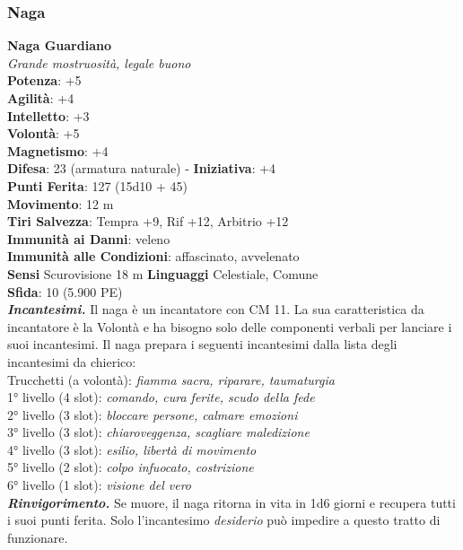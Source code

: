 \begin{multicols}{2}
\subsubsection{Naga}

\medskip\textbf{Naga Guardiano}\\
\emph{Grande mostruosità, legale buono}\\
\textbf{Potenza}: +5\\
\textbf{Agilità}: +4\\
\textbf{Intelletto}: +3\\
\textbf{Volontà}: +5\\
\textbf{Magnetismo}: +4\\
\textbf{Difesa}: 23 (armatura naturale) - \textbf{Iniziativa}: +4\\
\textbf{Punti Ferita}: 127 (15d10 + 45)\\
\textbf{Movimento}: 12 m\\
\textbf{Tiri Salvezza}: Tempra +9, Rif +12, Arbitrio +12\\
\textbf{Immunità ai Danni}: veleno\\
\textbf{Immunità alle Condizioni}: affascinato, avvelenato\\
\textbf{Sensi} Scurovisione 18 m \textbf{Linguaggi} Celestiale, Comune\\
\textbf{Sfida}: 10 (5.900 PE)\smallskip\\
\emph{\textbf{Incantesimi.}} Il naga è un incantatore con CM 11. La sua caratteristica da incantatore è la Volontà e ha bisogno solo delle componenti verbali per lanciare i suoi incantesimi. Il naga prepara i seguenti incantesimi dalla lista degli incantesimi da chierico:\\
Trucchetti (a volontà): \emph{fiamma sacra, riparare, taumaturgia}\\
1° livello (4 slot): \emph{comando, cura ferite, scudo della fede}\\
2° livello (3 slot): \emph{bloccare persone, calmare emozioni}\\
3° livello (3 slot): \emph{chiaroveggenza, scagliare maledizione}\\
4° livello (3 slot): \emph{esilio, libertà di movimento}\\
5° livello (2 slot): \emph{colpo infuocato, costrizione}\\
6° livello (1 slot): \emph{visione del vero}\\
\emph{\textbf{Rinvigorimento.}} Se muore, il naga ritorna in vita in 1d6 giorni e recupera tutti i suoi punti ferita. Solo l'incantesimo \emph{desiderio} può impedire a questo tratto di funzionare.\\

\end{multicols}
